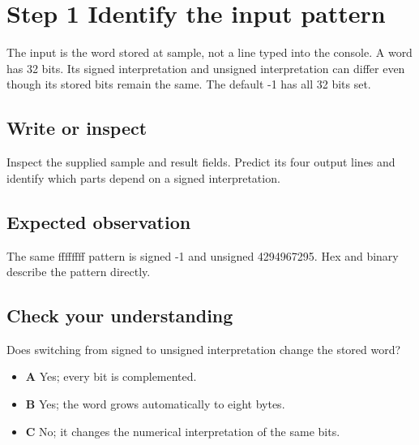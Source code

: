 \section{Step 1 Identify the input
  pattern}\label{004-bit-inspector-s01-step-1-identify-the-input-pattern}

The input is the word stored at sample, not a line typed into the
console. A word has 32 bits. Its signed interpretation and unsigned
interpretation can differ even though its stored bits remain the same.
The default -1 has all 32 bits set.

\subsection{Write or
  inspect}\label{004-bit-inspector-s01-write-or-inspect}

Inspect the supplied sample and result fields. Predict its four output
lines and identify which parts depend on a signed interpretation.

\subsection{Expected
  observation}\label{004-bit-inspector-s01-expected-observation}

The same ffffffff pattern is signed -1 and unsigned 4294967295. Hex and
binary describe the pattern directly.

\subsection{Check your
  understanding}\label{004-bit-inspector-s01-check-your-understanding}

Does switching from signed to unsigned interpretation change the stored
word?

\begin{itemize}
  \tightlist
  \item
        \textbf{A} Yes; every bit is complemented.
  \item
        \textbf{B} Yes; the word grows automatically to eight bytes.
  \item
        \textbf{C} No; it changes the numerical interpretation of the same
        bits.
\end{itemize}
